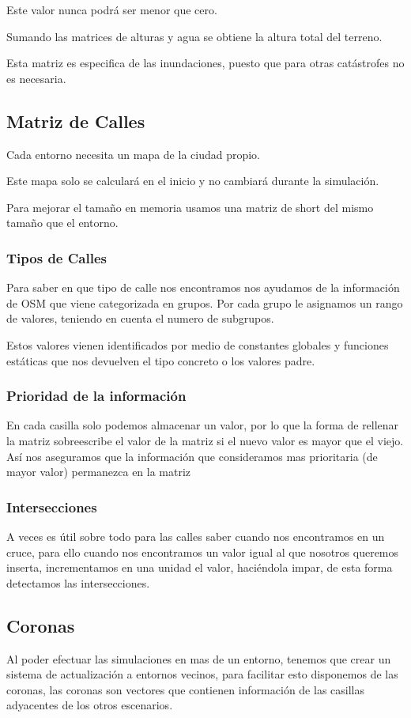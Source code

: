 Este valor nunca podrá ser menor que cero.

Sumando las matrices de alturas y agua se obtiene la altura total del terreno.

Esta matriz es especifica de las inundaciones, puesto que para otras
catástrofes no es necesaria.
\subsection*{Matriz de Calles}
Cada entorno necesita un mapa de la ciudad propio.

Este mapa solo se calculará en el inicio y no cambiará durante la simulación.

Para mejorar el tamaño en memoria usamos una matriz de short del mismo tamaño
que el entorno.
\subsubsection*{Tipos de Calles}
Para saber en que tipo de calle nos encontramos nos ayudamos de la información
de OSM que viene categorizada en grupos. Por cada grupo le asignamos un rango
de valores, teniendo en cuenta el numero de subgrupos.

Estos valores vienen identificados por medio de constantes globales y funciones
estáticas que nos devuelven el tipo concreto o los valores padre.
\subsubsection*{Prioridad de la información}
En cada casilla solo podemos almacenar un valor, por lo que la forma de
rellenar la matriz sobreescribe el valor de la matriz si el nuevo valor es
mayor que el viejo. Así nos aseguramos que la información que consideramos mas
prioritaria (de mayor valor) permanezca en la matriz
\subsubsection*{Intersecciones}
A veces es útil sobre todo para las calles saber cuando nos encontramos en un
cruce, para ello cuando nos encontramos un valor igual al que nosotros queremos
inserta, incrementamos en una unidad el valor, haciéndola impar, de esta forma
detectamos las intersecciones.
\subsection*{Coronas}
Al poder efectuar las simulaciones en mas de un entorno, tenemos que crear un
sistema de actualización a entornos vecinos, para facilitar esto disponemos de
las coronas, las coronas son vectores que contienen información de las casillas
adyacentes de los otros escenarios.

